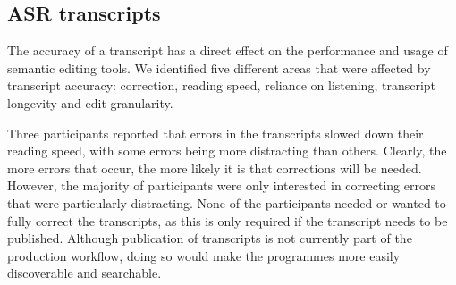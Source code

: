 

\subsection{ASR transcripts}



The accuracy of a transcript has a direct effect on the performance and usage of semantic editing tools. We identified
five different areas that were affected by transcript accuracy: correction, reading speed, reliance on listening,
transcript longevity and edit granularity.

Three participants reported that errors in the transcripts slowed down their reading speed, with some errors being more
distracting than others.  Clearly, the more errors that occur, the more likely it is that corrections will be needed.
However, the majority of participants were only interested in correcting errors that were particularly distracting.
None of the participants needed or wanted to fully correct the transcripts, as this is only required if the transcript
needs to be published. Although publication of transcripts is not currently part of the production
workflow, doing so would make the programmes more easily discoverable and searchable.

